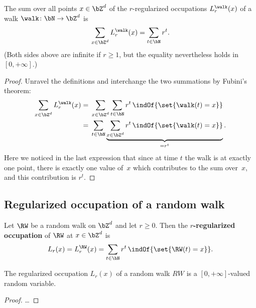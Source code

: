 \begin{lemma}
  \label{lem:sum_walk_regOcc_eq_geom_ser}
  The sum over all points $x \in \bZ^d$ of the $r$-regularized
  occupations $L^{\walk}_r(x)$ of a walk $\walk \colon \bN \to \bZ^d$ is
  \begin{align*}
  \sum_{x \in \bZ^d} L^{\walk}_r(x) = \sum_{t \in \bN} r^t .
  \end{align*}
  (Both sides above are infinite if $r \ge 1$, but the equality
  nevertheless holds in $[0,+\infty]$.)
\end{lemma}
\begin{proof}
Unravel the definitions and interchange the two summations by Fubini's theorem:
\begin{align*}
\sum_{x \in \bZ^d} L^{\walk}_r(x)
= & \; \sum_{x \in \bZ^d} \sum_{t \in \bN} r^t \, \indOf{\set{\walk(t) = x}} \\
= & \; \sum_{t \in \bN} \underbrace{\sum_{x \in \bZ^d} r^t \, \indOf{\set{\walk(t) = x}}}_{=r^t}.
\end{align*}
Here we noticed in the last expression that since at time $t$ the walk is
at exactly one point, there is exactly one value of~$x$ which contributes
to the sum over~$x$, and this contribution is $r^t$.
\end{proof}


\subsection*{Regularized occupation of a random walk}

\begin{definition}
  \label{def:regularized occupation}
  \leanok
  Let $\RW$ be a random walk on $\bZ^d$ and let $r \ge 0$.
  Then the \textbf{$r$-regularized occupation}
  of $\RW$ at $x \in \bZ^d$ is
  \begin{align}\label{eq: reg occupation}
  L_r(x) = L^{\RW}_r(x) = \sum_{t \in \bN} r^t \, \indOf{\set{\RW(t) = x}} .
  \end{align}
\end{definition}

\begin{lemma}
  \label{lem:regularized occupation_mble}
  The regularized occupation $L_r(x)$ of a random walk $RW$
  is a $[0,+\infty]$-valued random variable.
\end{lemma}
\begin{proof}
\ldots
\end{proof}

